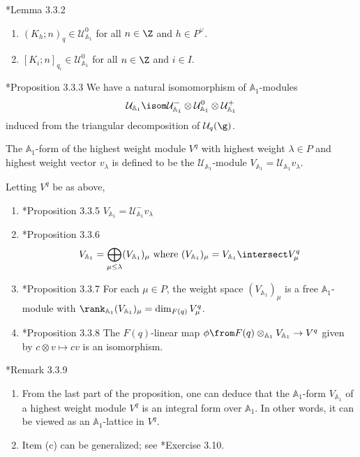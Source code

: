 \documentclass[11pt,leqno,oneside]{amsart}
\numberwithin{thm}{section}
\newcommand{\weightlattice}{P}
\newcommand{\U}{\mathcal{U}}
\newcommand{\A}{\mathbb{A}}
\begin{document}
\begin{lem}
  \cite{hong-kang}*{Lemma 3.3.2}
  \begin{enumerate}
  \item \((K_h;n)_q \in \U_{\A_1}^0\) for all \(n \in \Z\) and \(h \in
    \weightlattice^\vee\).
  \item \([K_i;n]_{q_i} \in \U_{\A_1}^0\) for all \(n \in \Z\) and \(i
    \in I\).
  \end{enumerate}
\end{lem}
\begin{prop}
  \cite{hong-kang}*{Proposition 3.3.3} We have a natural isomomorphism
  of \(\A_1\)-modules \[
    \U_{\A_1} \isom \U_{\A_1}^- \otimes \U_{\A_1}^0 \otimes \U_{\A_1}^+
  \]
  induced from the triangular decomposition of \(\U_q(\g)\).
\end{prop}
\begin{defn}
  The \(\A_1\)-form of the highest weight module \(V^q\) with highest
  weight \(\lambda \in \weightlattice\) and highest weight vector
  \(v_\lambda\) is defined to be the \(\U_{\A_1}\)-module \(V_{\A_1} =
  \U_{\A_1} v_\lambda\).
\end{defn}
\begin{prop}
  Letting \(V^q\) be as above,
  \begin{enumerate}
  \item \cite{hong-kang}*{Proposition 3.3.5} \(V_{\A_1} = \U_{\A_1}^-
    v_\lambda\)
  \item \cite{hong-kang}*{Proposition 3.3.6} \[
      V_{\A_1} = \bigoplus_{\mu \leq \lambda} (V_{\A_1})_\mu \text{
        where } (V_{\A_1})_\mu = V_{\A_1} \intersect V^q_\mu
    \]
  \item \cite{hong-kang}*{Proposition 3.3.7} For each \(\mu \in
    \weightlattice\), the weight space \((V_{\A_1})_\mu\) is a free
    \(\A_1\)-module with \(\rank_{\A_1}(V_{\A_1})_\mu = \dim_{F(q)}
    V^q_\mu\).
  \item \cite{hong-kang}*{Proposition 3.3.8} The \(F(q)\)-linear map
    \(\phi \from F(q) \otimes_{\A_1} V_{\A_1} \to V^q\) given by \(c
    \otimes v \mapsto cv\) is an isomorphism.
  \end{enumerate}
\end{prop}
\begin{rmk}
  \cite{hong-kang}*{Remark 3.3.9}
  \begin{enumerate}
  \item From the last part of the proposition, one can deduce that the
    \(\A_1\)-form \(V_{\A_1}\) of a highest weight module \(V^q\) is
    an integral form over \(\A_1\). In other words, it can be viewed
    as an \(\A_1\)-lattice in \(V^q\).
  \item Item (c) can be generalized; see \cite{hong-kang}*{Exercise
      3.10}. 
  \end{enumerate}
\end{rmk}
\end{document}
